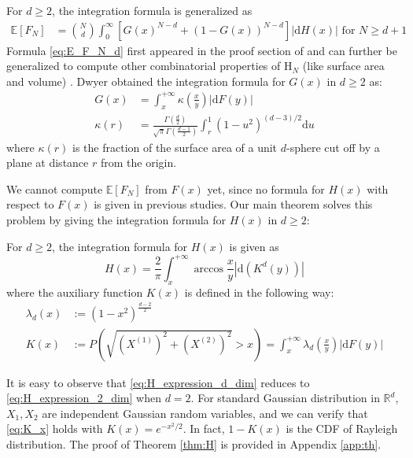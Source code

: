 \documentclass{aptpub}
\def\E{\mathbb{E}}
\def\R{\mathbb{R}}
\def\d{\mathrm{d}}
\begin{document}
For $d\geq 2$, the integration formula is generalized as
\begin{align}
     \E[F_N] &= \binom{N}{d} \int_0^{\infty} 
     \left[G(x)^{N-d} + (1-G(x))^{N-d} \right]|\mathrm{d} H(x)| 
     \textrm{ for } N \geq d+1 \label{eq:E_F_N_d}
\end{align}
Formula \eqref{eq:E_F_N_d} first appeared in the proof section of \cite{raynaud1970enveloppe}
and can further be generalized to compute other combinatorial properties of $\mathrm{H}_N$ (like surface area and volume)
\cite{barany2008random}.
Dwyer obtained the integration formula for $G(x)$ in $d\geq 2$ as:
\begin{align}\label{eq:G_d_kappa}
     G(x) & = \int_x^{+\infty} \kappa \left(\frac{x}{y} \right) |\mathrm{d}F(y)| \\
     \kappa(r) & = \frac{\Gamma(\frac{d}{2})}
     {\sqrt{\pi}\Gamma(\frac{d-1}{2})}\int_r^{1}
     (1-u^2)^{(d-3)/2}\mathrm{d}u\label{eq:kappa_r}
\end{align}
where $\kappa(r)$ is the fraction of the surface area of a unit $d$-sphere
cut off by a plane at distance $r$ from the origin.

We cannot compute $\E[F_N]$ from $F(x)$ yet, since no formula for $H(x)$ with respect to $F(x)$ is given in previous studies.
Our main theorem solves this problem by giving the integration formula for $H(x)$ in $d\geq 2$:
\begin{theorem}\label{thm:H}
For $d\geq 2$, the integration formula for $H(x)$ is given as
\begin{equation}
     H(x) = \frac{2}{\pi}
     \int_x^{+\infty} \arccos\frac{x}{y}
     |\mathrm{d} (K^d(y))|\label{eq:H_expression_d_dim}
\end{equation}
where the auxiliary function $K(x)$ is defined in the following way:
\begin{align}
     \lambda_d(x) & :=(1-x^2)^{\frac{d-2}{2}}
     \label{eq:lambda_r}\\
     K(x) &:=P\left(\sqrt{(X^{(1)})^2+(X^{(2)})^2}>x \right)=
     \int_x^{+\infty}
     \lambda_d \left(\frac{x}{y} \right)|\d F(y)|
     \label{eq:K_x}
\end{align}
\end{theorem}
It is easy to observe that \eqref{eq:H_expression_d_dim} reduces to 
\eqref{eq:H_expression_2_dim} when $d=2$.
For standard Gaussian distribution in $\R^d$,
$X_1, X_2$ are independent
Gaussian random variables, and we can verify that \eqref{eq:K_x} holds with $K(x) = e^{-x^2/2}$.
In fact, $1-K(x)$ is the CDF of Rayleigh distribution.
The proof of Theorem \ref{thm:H}
is provided in Appendix \ref{app:th}.
\end{document}
